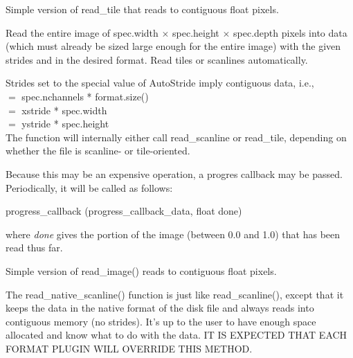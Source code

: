 Simple version of {\kw read_tile} that reads to contiguous float pixels.
\apiend


Read the entire image of {\kw spec.width} $\times$ {\kw spec.height}
$\times$ {\kw spec.depth}
pixels into data (which must already be sized large enough for
the entire image) with the given strides and in the desired
format.  Read tiles or scanlines automatically.  

Strides set to the special value of {\kw AutoStride} imply contiguous
data, i.e., \\
 $=$ {\kw spec.nchannels * format.size()} \\
 $=$ {\kw xstride * spec.width} \\
 $=$ {\kw ystride * spec.height} \\
The function will internally either call {\kw read_scanline} or 
{\kw read_tile}, depending on whether the file is scanline- or
tile-oriented.

Because this may be an expensive operation, a progres callback may be passed.
Periodically, it will be called as follows:\\
\begin{code}
    progress_callback (progress_callback_data, float done)
\end{code}
\noindent where \emph{done} gives the portion of the image 
(between 0.0 and 1.0) that has been read thus far.
\apiend

Simple version of {\kw read_image()} reads to contiguous float pixels.
\apiend

The {\kw read_native_scanline()} function is just like {\kw
  read_scanline()}, except that it keeps the data in the native format
of the disk file and always reads into contiguous memory (no strides).
It's up to the user to have enough space allocated and know what to do
with the data.  IT IS EXPECTED THAT EACH FORMAT PLUGIN WILL OVERRIDE
THIS METHOD.
\apiend

